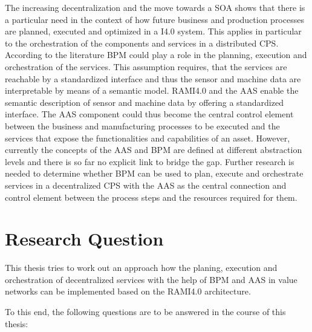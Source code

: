 The increasing decentralization and the move towards a \ac{SOA} shows that there is a particular need in the context of how future business and production processes are planned, executed and optimized in a \ac{I4.0} system. This applies in particular to the orchestration of the components and services in a distributed \ac{CPS}. According to the literature \ac{BPM} could play a role in the planning, execution and orchestration of the services. This assumption requires, that the services are reachable by a standardized interface and thus the sensor and machine data are interpretable by means of a semantic model. \ac{RAMI4.0} and the \ac{AAS} enable the semantic description of sensor and machine data by offering a standardized interface. The \ac{AAS} component could thus become the central control element between the business and manufacturing processes to be executed and the services that expose the functionalities and capabilities of an asset. However, currently the concepts of the \ac{AAS} and \ac{BPM} are defined at different abstraction levels and there is so far no explicit link to bridge the gap. Further research is needed to determine whether BPM can be used to plan, execute and orchestrate services in a decentralized \ac{CPS} with the \ac{AAS} as the central connection and control element between the process steps and the resources required for them. 

\section{Research Question}
This thesis tries to work out an approach how the planing, execution and orchestration of decentralized services with the help of \ac{BPM} and \ac{AAS} in value networks can be implemented based on the \ac{RAMI4.0} architecture.

To this end, the following questions are to be answered in the course of this thesis:

